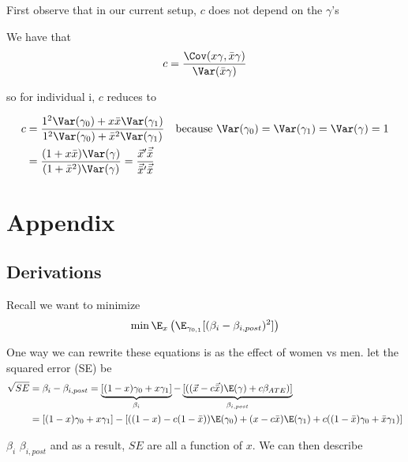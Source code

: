 First observe that in our current setup, $c$ does not depend on the $\gamma$'s

We have that
\begin{align*}
	c = \frac{\Cov (x \gamma, \bar{x} \gamma)}{ \Var( \bar{x} \gamma )}
\end{align*} 

so for individual i, $c$ reduces to


\begin{align*}
	c &= \frac{1^2\Var(\gamma_0) + x \bar{x} \Var(\gamma_1)}{1^2\Var(\gamma_0) + \bar{x}^2\Var(\gamma_1)} \quad \text{because $\Var(\gamma_0) = \Var(\gamma_1) = \Var(\gamma) = 1$} \\
	  &= \frac{(1 + x \bar{x})\Var(\gamma)}{(1 + \bar{x}^2)\Var(\gamma)} = \frac{\vec{x}' \vec{\bar{x}}}{\vec{\bar{x}}' \vec{\bar{x}}}
\end{align*} 




\section{Appendix}

\subsection*{Derivations}

Recall we want to minimize
\begin{align*}
\min \E_x \left(\E_{\gamma_{0,1}}[(\beta_i - \beta_{i,post})^2]\right)
\end{align*}

One way we can rewrite these equations is as the effect of women vs men.
let the squared error (SE) be
\begin{align*}
	\sqrt{SE} &= \beta_i -  \beta_{i,post} = \underbrace{[(1-x) \gamma_0 + x \gamma_1]}_{\text{$\beta_i$}}  - \underbrace{[((\vec{x} - c \vec{\bar{x}})\E(\gamma) + c \beta_{ATE})]}_\text{$\beta_{i,post}$} \\
	  &= [(1-x) \gamma_0 + x \gamma_1]  - [((1-x) - c (1 - \bar{x})) \E(\gamma_0) + (x - c \bar{x})\E(\gamma_1) + c((1-\bar{x}) \gamma_0 + \bar{x} \gamma_1)] \\
\end{align*}

$\beta_i$ $\beta_{i, post}$ and as a result, $SE$ are all a function of $x$. We can then describe

